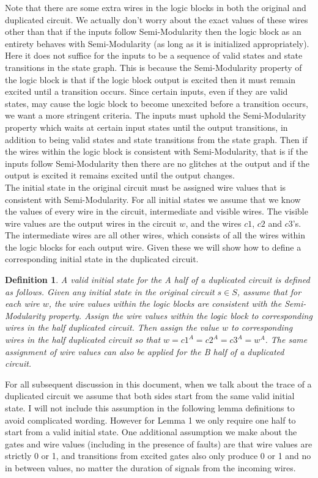 \documentclass[12pt]{report}
\newtheorem*{definition}{Definition}
\begin{document}
Note that there are some extra wires in the logic blocks in both the original and duplicated circuit.  We actually don't worry about the exact values of these wires other than that if the inputs follow Semi-Modularity then the logic block as an entirety behaves with Semi-Modularity (as long as it is initialized appropriately).  Here it does not suffice for the inputs to be a sequence of valid states and state transitions in the state graph.  This is because the Semi-Modularity property of the logic block is that if the logic block output is excited then it must remain excited until a transition occurs.  Since certain inputs, even if they are valid states, may cause the logic block to become unexcited before a transition occurs, we want a more stringent criteria.  The inputs must uphold the Semi-Modularity property which waits at certain input states until the output transitions, in addition to being valid states and state transitions from the state graph.  Then if the wires within the logic block is consistent with Semi-Modularity, that is if the inputs follow Semi-Modularity then there are no glitches at the output and if the output is excited it remains excited until the output changes. \\%

The initial state in the original circuit must be assigned wire values that is consistent with Semi-Modularity.  For all initial states we assume that we know the values of every wire in the circuit, intermediate and visible wires.  The visible wire values are the output wires in the circuit $w$, and the wires $c1$, $c2$ and $c3$'s. The intermediate wires are all other wires, which consists of all the wires within the logic blocks for each output wire.  Given these we will show how to define a corresponding initial state in the duplicated circuit.  %
\begin{definition} A {\em valid initial state} for the A half of a duplicated circuit is defined as follows.  Given any initial state in the original circuit $s \in S$, assume that for each wire $w$, the wire values within the logic blocks are consistent with the Semi-Modularity property.  Assign the wire values within the logic block to corresponding wires in the half duplicated circuit.  Then assign the value $w$ to corresponding wires in the half duplicated circuit so that $w=c1^A=c2^A=c3^A=w^A$. The same assignment of wire values can also be applied for the B half of a duplicated circuit.
\end{definition}
For all subsequent discussion in this document, when we talk about the trace of a duplicated circuit we assume that both sides start from the same valid initial state.  I will not include this assumption in the following lemma definitions to avoid complicated wording.  %
However for Lemma 1 we only require one half to start from a valid initial state.  
One additional assumption we make about the gates and wire values (including in the presence of faults) are that wire values are strictly 0 or 1, and transitions from excited gates also only produce 0 or 1 and no in between values, no matter the duration of signals from the incoming wires.\\
\end{document}
